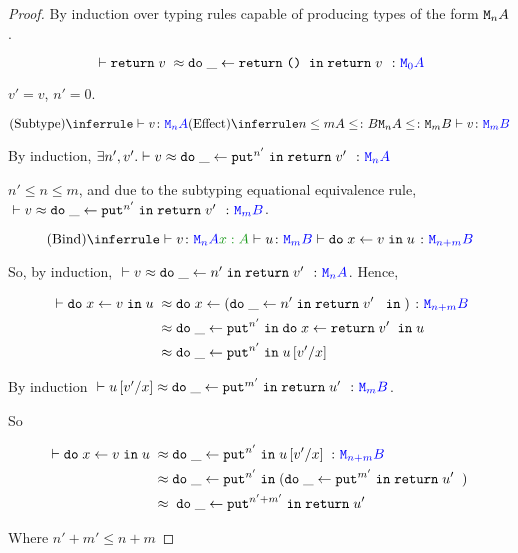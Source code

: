 \documentclass{Report}
\newcommand{\zberelation}[3]{\berelation{}{#1}{#2}{#3}}
\newcommand\ztyperelation[2]{\typerelation{}{#1}{#2}}
\renewcommand\put[0]{\texttt{put}}
\newcommand\mna[0]{\M{n}{A}}
\newcommand\mmb[0]{\M{m}{B}}
\begin{document}
\begin{proof}
    By induction over typing rules capable of producing types of the form $\mna$.


    $$\zberelation{\return{v}}{\doin{\_}{\return{\u}}{\return{v}}}{\M{0}{A}}$$

    $v' = v$, $n' = 0$.


    \begin{equation}
        \ntreeruleII{Subtype}{\ztyperelation{v}{\mna}}{\subeffecttree{n}{A}{m}{B}}{\ztyperelation{v}{\mmb}}
    \end{equation}

    By induction, $\exists n', v'. \zberelation{v}{\doin{\_}{\put^{n'}}{\return{v'}}}{\mna}$

    $n' \leq n \leq m$, and due to the subtyping equational equivalence rule, $\zberelation{v}{\doin{\_}{\put^{n'}}{\return{v'}}}{\mmb}$.


    
    $$\ntreeruleII{Bind}{\ztyperelation{v}{\mna}}{\typerelation{x: A}{u}{\mmb}}{\ztyperelation{\doin{x}{v}{u}}{\M{n+m}{B}}}$$

    So, by induction, $\zberelation{v}{\doin{\_}{n'}{\return{v'}}}{\mna}$. Hence,


    \begin{align}
        \zberelation{\doin{x}{v}{u}}{&\s\doin{x}{(\doin{\_}{n'}{\return{v'}}})}{\M{n+m}{B}}\\
        \beequiv&\s\doin{\_}{\put^{n'}}{\doin{x}{\return{v'}}{u}}\\
        \beequiv&\s \doin{\_}{\put^{n'}}{u\ssub{x}{v'}}
    \end{align}

    By induction $\zberelation{u\ssub{x}{v'}}{\doin{\_}{\put^{m'}}{\return{u'}}}{\mmb}$.

    So

    \begin{align}
        \zberelation{\doin{x}{v}{u}}{&\s\doin{\_}{\put^{n'}}{u\ssub{x}{v'}}}{\M{n+m}{B}} \\
        \beequiv & \s\doin{\_}{\put^{n'}}{(\doin{\_}{\put^{m'}}{\return{u'}})}\\
        \beequiv &\s \s\doin{\_}{\put^{n'+m'}}{\return{u'}}
    \end{align}

    Where $n' + m'\leq n+m$
    
    


\end{proof}
\end{document}
